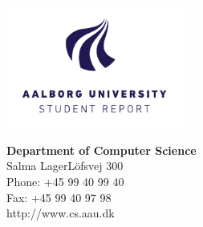 {}
\thispagestyle{empty}

\begin{minipage}[t]{0.48\textwidth}
\vspace*{-25pt}			%
\includegraphics[height=4cm]{images/AAU-logo-stud-UK-RGB}
\end{minipage}
\hfill
\begin{minipage}[t]{0.48\textwidth}
{\small \textbf{Department of Computer Science}\\
\small Salma LagerLöfsvej 300 \\
\small Phone: +45 99 40 99 40 \\
\small Fax: +45 99 40 97 98 \\
\small http://www.cs.aau.dk}

\end{minipage}

\vspace*{1cm}

